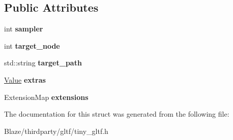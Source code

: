 \subsection*{Public Attributes}
\begin{DoxyCompactItemize}
\item 
\mbox{\label{structtinygltf_1_1AnimationChannel_ac50383611c6ec5e7ecbae24ba1ef3d54}} 
int {\bfseries sampler}
\item 
\mbox{\label{structtinygltf_1_1AnimationChannel_ac1f95a6c8a1933cfd039c85941a88b08}} 
int {\bfseries target\+\_\+node}
\item 
\mbox{\label{structtinygltf_1_1AnimationChannel_a41fad7841bdb362038566265eea5e33e}} 
std\+::string {\bfseries target\+\_\+path}
\item 
\mbox{\label{structtinygltf_1_1AnimationChannel_acae9acf40d7706588237b1e8b54c8d67}} 
\hyperlink{classtinygltf_1_1Value}{Value} {\bfseries extras}
\item 
\mbox{\label{structtinygltf_1_1AnimationChannel_a616ba3e9762d050e999c9fc397f1937a}} 
Extension\+Map {\bfseries extensions}
\end{DoxyCompactItemize}


The documentation for this struct was generated from the following file\+:\begin{DoxyCompactItemize}
\item 
Blaze/thirdparty/gltf/tiny\+\_\+gltf.\+h\end{DoxyCompactItemize}

